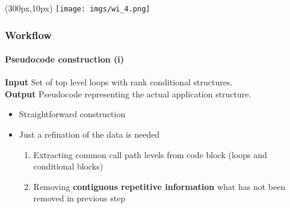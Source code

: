 \documentclass{beamer}
\begin{document}
\begin{frame}
\begin{textblock*}{5cm}(300px,10px) %
	\texttt{[image: imgs/wi\_4.png]}
\end{textblock*}
\frametitle{Workflow}
\framesubtitle{Pseudocode construction (i)}
\begin{mdframed}[backgroundcolor=black!10,roundcorner=5pt,linewidth=0pt]
\textbf{Input} Set of top level loops with rank conditional structures.\\
\textbf{Output} Pseudocode representing the actual application structure.
\end{mdframed}
\vfill
\pause
\begin{itemize}
	\item Straightforward construction
	\item Just a refination of the data is needed
	\begin{enumerate}
		\item Extracting common call path levels from code block (loops and conditional blocks)
		\item Removing \textbf{contiguous repetitive information} what has not been removed in previous step
	\end{enumerate}
\end{itemize}
\end{frame}

\end{document}
